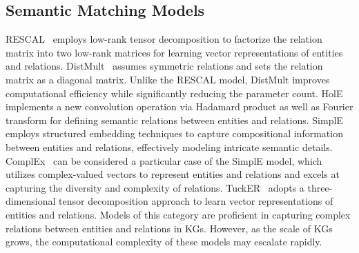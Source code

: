 \documentclass[letterpaper]{article} %
\begin{document}
\subsection{Semantic Matching Models}
RESCAL~\cite{RESCAL} employs low-rank tensor decomposition to factorize the relation matrix into two low-rank matrices for learning vector representations of entities and relations. DistMult~\cite{DistMult} assumes symmetric relations and sets the relation matrix as a diagonal matrix. Unlike the RESCAL model, DistMult improves computational efficiency while significantly reducing the parameter count. HolE~\cite{HolE} implements a new convolution operation via Hadamard product as well as Fourier transform for defining semantic relations between entities and relations. SimplE~\cite{SimplE} employs structured embedding techniques to capture compositional information between entities and relations, effectively modeling intricate semantic details. ComplEx~\cite{ComplEx} can be considered a particular case of the SimplE model, which utilizes complex-valued vectors to represent entities and relations and excels at capturing the diversity and complexity of relations. TuckER~\cite{TuckER} adopts a three-dimensional tensor decomposition approach to learn vector representations of entities and relations. Models of this category are proficient in capturing complex relations between entities and relations in KGs. However, as the scale of KGs grows, the computational complexity of these models may escalate rapidly.
\end{document}
